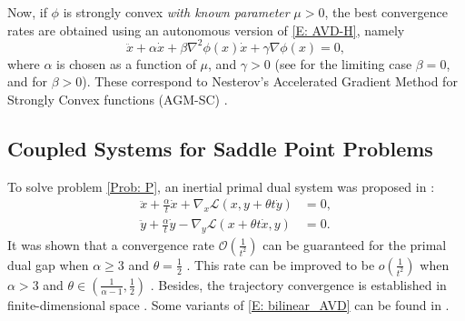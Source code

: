 \documentclass[pdflatex,sn-mathphys-num]{sn-jnl}
\theoremstyle{thmstyleone}
\theoremstyle{thmstyletwo}
\theoremstyle{thmstylethree}
\begin{document}
Now, if $\phi$ is strongly convex {\it with known parameter} $\mu>0$, the best convergence rates are obtained using an autonomous version of \eqref{E: AVD-H}, namely
\begin{equation}\label{E: HBF-H}\tag{HBF-H}
\ddot{x} + \alpha\dot{x} + \beta\nabla^2 \phi(x)\dot{x} + \gamma\nabla \phi(x) = 0,
\end{equation}
where $\alpha$ is chosen as a function of $\mu$, and  $\gamma>0$ (see \cite{Polyak_1964,Attouch_2000,Siegel_2019,Luo_2022,Aujol_2022} for the limiting case $\beta=0$, and \cite{Shi_2022,Attouch_2022,Wang_2025_AGM} for $\beta>0$). These correspond to Nesterov's Accelerated Gradient Method for Strongly Convex functions (AGM-SC) \cite{Nesterov_2004}.




\subsection*{Coupled Systems for Saddle Point Problems}

To solve problem \eqref{Prob: P}, an inertial primal dual system was proposed in \cite{Zeng_2020}:
\begin{equation}\label{E: bilinear_AVD}
\begin{aligned}
\ddot{x} + \frac{\alpha}{t}\dot{x} + \nabla_x \mathcal{L}(x,y+\theta t \dot{y}) &= 0,\\
\ddot{y} + \frac{\alpha}{t}\dot{y} - \nabla_y \mathcal{L}(x+\theta t\dot{x},y) &= 0.
\end{aligned}
\end{equation}
It was shown that a convergence rate $\mathcal{O}\left( \frac{1}{t^2} \right)$ can be guaranteed for the primal dual gap when $\alpha\ge 3$ and $\theta = \frac{1}{2}$ \cite{Zeng_2020}. This rate can be improved to be $o\left( \frac{1}{t^2} \right)$ when $\alpha>3$ and $\theta\in\left( \frac{1}{\alpha-1}, \frac{1}{2} \right)$ \cite{He_2026_bilinear}. Besides, the trajectory convergence is established in finite-dimensional space \cite{He_2026_bilinear}. Some variants of \eqref{E: bilinear_AVD} can be found in \cite{He_2024_bilinear,Ding_2025}. 
\end{document}

